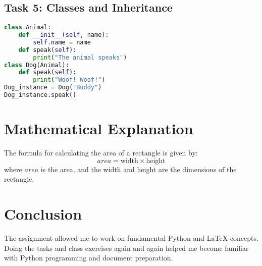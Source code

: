 \documentclass{article}
\begin{document}
\subsection{Task 5: Classes and Inheritance}
\begin{lstlisting}[language=Python]
class Animal:
    def __init__(self, name):
        self.name = name
    def speak(self):
        print("The animal speaks")
class Dog(Animal):
    def speak(self):
        print("Woof! Woof!")
Dog_instance = Dog("Buddy")
Dog_instance.speak()
\end{lstlisting}

\section{Mathematical Explanation}
The formula for calculating the area of a rectangle is given by:
\[
area = \text{width} \times \text{height}
\]
where \( area \) is the area, and the width and height are the dimensions of the rectangle.


\section{Conclusion}
The assignment allowed me to work on fundamental Python and LaTeX concepts. Doing the tasks and class exercises again and again helped me become familiar with Python programming and document preparation. 
\end{document}

